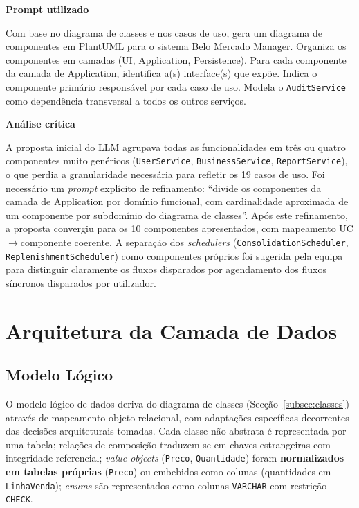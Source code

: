     \begin{tcolorbox}[title=Interação com o LLM]
    \textbf{Prompt utilizado}

    Com base no diagrama de classes e nos casos de uso, gera um diagrama de componentes em PlantUML para o sistema Belo Mercado Manager. Organiza os componentes em camadas (UI, Application, Persistence). Para cada componente da camada de Application, identifica a(s) interface(s) que expõe. Indica o componente primário responsável por cada caso de uso. Modela o \texttt{AuditService} como dependência transversal a todos os outros serviços.

    \tcblower

    \textbf{Análise crítica}

    A proposta inicial do LLM agrupava todas as funcionalidades em três ou quatro componentes muito genéricos (\texttt{UserService}, \texttt{BusinessService}, \texttt{ReportService}), o que perdia a granularidade necessária para refletir os 19 casos de uso. Foi necessário um \textit{prompt} explícito de refinamento: ``divide os componentes da camada de Application por domínio funcional, com cardinalidade aproximada de um componente por subdomínio do diagrama de classes''. Após este refinamento, a proposta convergiu para os 10 componentes apresentados, com mapeamento UC$\rightarrow$componente coerente. A separação dos \textit{schedulers} (\texttt{ConsolidationScheduler}, \texttt{ReplenishmentScheduler}) como componentes próprios foi sugerida pela equipa para distinguir claramente os fluxos disparados por agendamento dos fluxos síncronos disparados por utilizador.
    \end{tcolorbox}

\section{Arquitetura da Camada de Dados}
\label{sec:dados}

\subsection{Modelo Lógico}
\label{subsec:modelo-logico}

    O modelo lógico de dados deriva do diagrama de classes (Secção~\ref{subsec:classes}) através de mapeamento objeto-relacional, com adaptações específicas decorrentes das decisões arquiteturais tomadas. Cada classe não-abstrata é representada por uma tabela; relações de composição traduzem-se em chaves estrangeiras com integridade referencial; \textit{value objects} (\texttt{Preco}, \texttt{Quantidade}) foram \textbf{normalizados em tabelas próprias} (\texttt{Preco}) ou embebidos como colunas (quantidades em \texttt{LinhaVenda}); \textit{enums} são representados como colunas \texttt{VARCHAR} com restrição \texttt{CHECK}.

